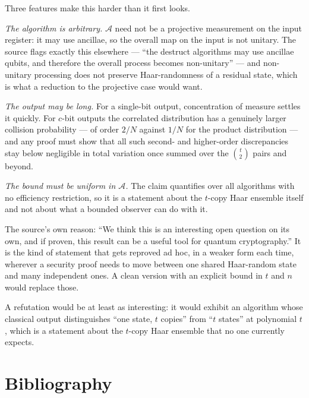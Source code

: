\documentclass{conjura-conjecture}
\newcommand{\A}{\mathcal{A}}
\begin{document}
\begin{remark}\label{rem:difficulty}
Three features make this harder than it first looks.

\emph{The algorithm is arbitrary.} $\A$ need not be a projective
measurement on the input register: it may use ancillae, so the overall
map on the input is not unitary. The source flags exactly this elsewhere
--- ``the destruct algorithms may use ancillae qubits, and therefore the
overall process becomes non-unitary'' --- and non-unitary processing does
not preserve Haar-randomness of a residual state, which is what a
reduction to the projective case would want.

\emph{The output may be long.} For a single-bit output, concentration of
measure settles it quickly. For $c$-bit outputs the correlated
distribution has a genuinely larger collision probability --- of order
$2/N$ against $1/N$ for the product distribution --- and any proof must
show that all such second- and higher-order discrepancies stay below
negligible in total variation once summed over the
$\binom{t}{2}$ pairs and beyond.

\emph{The bound must be uniform in $\A$.} The claim quantifies over all
algorithms with no efficiency restriction, so it is a statement about the
$t$-copy Haar ensemble itself and not about what a bounded observer can
do with it.
\end{remark}

\begin{remark}\label{rem:why}
The source's own reason: ``We think this is an interesting open question
on its own, and if proven, this result can be a useful tool for quantum
cryptography.'' It is the kind of statement that gets reproved ad hoc,
in a weaker form each time, wherever a security proof needs to move
between one shared Haar-random state and many independent ones. A clean
version with an explicit bound in $t$ and $n$ would replace those.

A refutation would be at least as interesting: it would exhibit an
algorithm whose classical output distinguishes ``one state, $t$ copies''
from ``$t$ states'' at polynomial $t$, which is a statement about the
$t$-copy Haar ensemble that no one currently expects.
\end{remark}

\section{Bibliography}
\end{document}

